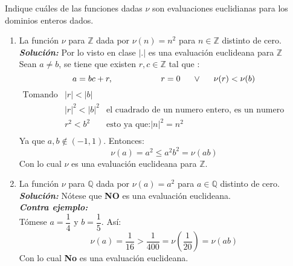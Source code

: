 Indique cuáles de las funciones dadas $\nu$ son evaluaciones euclidianas para los dominios enteros dados.
    \begin{enumerate}
        \item La función $\nu$ para $\mathbb{Z}$ dada por $\nu(n) = n^2$ para $n \in \mathbb{Z}$ distinto de cero.\\
        \textbf{\textit{Soluci\'on:}} Por lo visto en clase $|.|$ es una evaluaci\'on euclideana para $\mathbb{Z}$ \\
        Sean $a\neq b$, se tiene que existen $r,c\in \mathbb{Z}$ tal que :
        $$a=bc + r ,\hspace{2cm}r=0\hspace{0.5cm}\lor\hspace{0.5cm}\nu(r)<\nu(b)$$
        $$
        \begin{array}{cll}
            \text{Tomando} & |r|<|b| &\\
             & |r|^2<|b|^2 & \text{el cuadrado de un numero entero, es un numero entero} \\
             & r^2<b^2 & \text{esto ya que:} |n|^2=n^2 \\
        \end{array}
        $$
        Ya que $a,b\notin(-1,1)$. Entonces: 
        $$\nu(a)=a^2\leq a^2b^2=\nu(ab)$$
        Con lo cual $\nu$ es una evaluaci\'on euclideana para $\mathbb{Z}$.
        \item La función $\nu$ para $\mathbb{Q}$ dada por $\nu(a) = a^2$ para $a \in \mathbb{Q}$ distinto de cero.\\
        \textbf{\textit{Soluci\'on:}}
        Nótese que \textbf{NO} es una evaluaci\'on euclideana. \\
        \textbf{\textit{Contra ejemplo:}}\\
        T\'omese $a=\dfrac{1}{4}$ y $b=\dfrac{1}{5}$. As\'i: 
        $$\nu(a)=\dfrac{1}{16}> \dfrac{1}{400}=\nu\left(\dfrac{1}{20}\right)=\nu(ab)$$
        Con lo cual \textbf{No} es una evaluaci\'on euclideana.
    \end{enumerate}